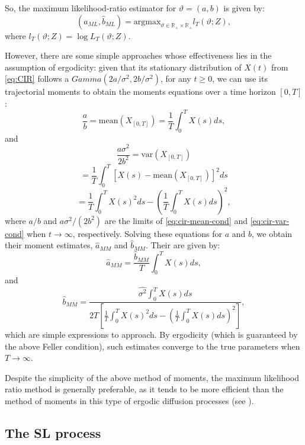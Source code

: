\documentclass[12pt]{article}
\begin{document}
So,  the maximum likelihood-ratio estimator for $\vartheta=(a,b)$ is given by:
\begin{equation}\label{eq:ML-CIR}
(\hat{a}_{ML}, \hat{b}_{ML})=\text{argmax}_{\vartheta\in \mathbb{R}_+\times\mathbb{R}_+} l_T(\vartheta; Z),
\end{equation}
where $l_T(\vartheta; Z)=\log L_T(\vartheta; Z)$.

However, there are some simple approaches whose effectiveness lies in the assumption of ergodicity: given that its stationary distribution of $X(t)$ from \eqref{eq:CIR}  follows a $Gamma(2a/\sigma^2,2b/\sigma^2)$, for any $t\geq0$, we can use its trajectorial moments to obtain the moments equations over a time horizon $[0,T]$:
\[
\frac{a}{b}=\text{mean}(X_{[0,T]})=\frac{1}{T}\int_{0}^{T}X(s)ds, \]
and 
\[\frac{a\sigma^2}{2b^2}=\text{var}(X_{[0,T]})\]
\[=\frac{1}{T}\int_{0}^{T}[X(s)-\text{mean}(X_{[0,T]})]^2ds
\]
\[
=\frac{1}{T}\int_{0}^{T}X(s)^2ds-\left(\frac{1}{T}\int_{0}^{T}X(s)ds\right)^2,
\]
where $a/b$ and $a\sigma^2/(2b^2)$ are the limits of \eqref{eq:cir-mean-cond} and \eqref{eq:cir-var-cond} when $t\rightarrow\infty$, respectively. Solving these equations for $a$ and $b$, we obtain their moment estimates, $\hat{a}_{MM}$ and $\hat{b}_{MM}$. Their are given by:
\begin{equation}\label{eq:a-mm}
\hat{a}_{MM}=\frac{\hat{b}_{MM}}{T}\int_{0}^{T}X(s)ds,
\end{equation}
and 
\begin{equation}\label{eq:b-mm}
\hat{b}_{MM}=\frac{\widehat{\sigma^2}\int_{0}^{T}X(s)ds}{2T\left[\frac{1}{T}\int_{0}^{T}X(s)^2ds-\left(\frac{1}{T}\int_{0}^{T}X(s)ds\right)^2\right]},
\end{equation}
which are simple expressions to approach. By ergodicity (which is guaranteed by the above Feller condition), such estimates converge to the true parameters when $T\rightarrow\infty$.

Despite the simplicity of the above method of moments, the maximum likelihood ratio method is generally preferable, as it tends to be more efficient than the method of moments in this type of ergodic diffusion processes (see \citep{kutoyants2004statistical}).

\subsection{The SL process}\label{sec:stat-sl}
\end{document}
